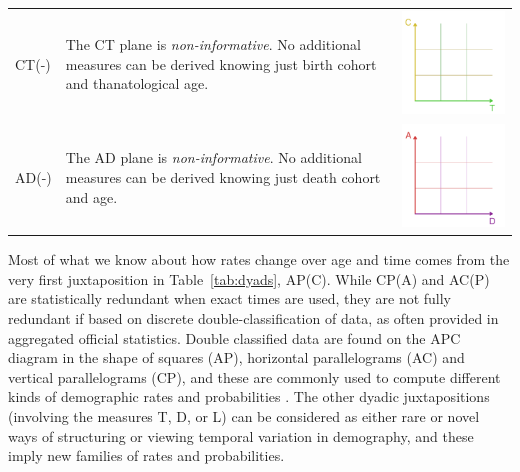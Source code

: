 \documentclass[12pt,oneside,a4paper,doublespacing]{article} %
\theoremstyle{definition}
\begin{document}
\begin{longtable}{m{}L{0.5\textwidth}C{0.2\textwidth}}
  \\
  CT(-) &
  The CT plane is \emph{non-informative}. No additional measures can be derived
  knowing just birth cohort and thanatological age. &
  \includegraphics[scale=.5]{Figures/DiagramTable/CT_rt.pdf} \\
  AD(-) &
  The AD plane is \emph{non-informative}. No additional measures can be derived
  knowing just death cohort and age. &
  \includegraphics[scale=.5]{Figures/DiagramTable/AD_rt.pdf} 
\\
  \bottomrule
\end{longtable}

Most of what we know about how rates change over age and time comes
from the very first juxtaposition in Table~\ref{tab:dyads}, AP(C). While
CP(A) and AC(P) are statistically redundant when exact times are used, they
are not fully redundant if based on discrete double-classification of data, as
often provided in aggregated official statistics. Double classified data are
found on the APC diagram in the shape of squares (AP), horizontal parallelograms
(AC) and vertical parallelograms (CP), and
these are commonly used to compute different kinds of demographic
rates and probabilities \citep[p.~63]{caselli2005demography}. The other dyadic
juxtapositions (involving the measures T, D, or L) can be considered as either
rare or novel ways of structuring or viewing temporal variation in demography,
and these imply new families of rates and probabilities.
\end{document}
